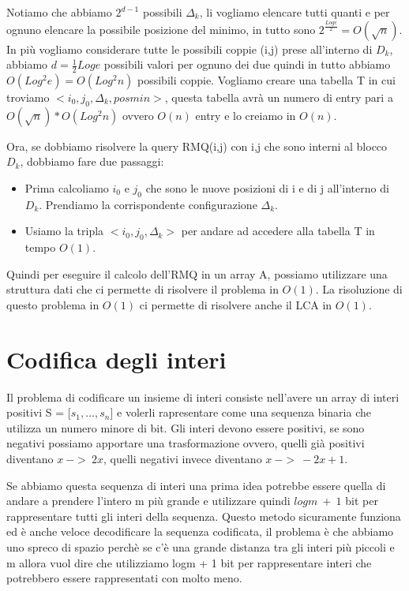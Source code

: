 \documentclass[14pt]{extreport}
\begin{document}
Notiamo che abbiamo $2^{d-1}$ possibili $\Delta_k$, li vogliamo elencare tutti quanti e per ognuno elencare la possibile posizione del minimo, in tutto sono $2^{\frac{Loge}{2}} = O(\sqrt{n})$.
In più vogliamo considerare tutte le possibili coppie (i,j) prese all'interno di $D_k$, abbiamo $d=\frac{1}{2}Log e$ possibili valori per ognuno dei due quindi in tutto abbiamo $O(Log^2 e) = O(Log^2 n)$ possibili coppie.
Vogliamo creare una tabella T in cui troviamo $<i_0,j_0, \Delta_k, pos min>$, questa tabella avrà un numero di entry pari a $O(\sqrt{n})*O(Log^2 n)$ ovvero $O(n)$ entry e lo creiamo in $O(n)$.

Ora, se dobbiamo risolvere la query RMQ(i,j) con i,j che sono interni al blocco $D_k$, dobbiamo fare due passaggi:
\begin{itemize}
\item Prima calcoliamo $i_0$ e $j_0$ che sono le nuove posizioni di i e di j all'interno di $D_k$. Prendiamo la corrispondente configurazione $\Delta_k$.
\item Usiamo la tripla $<i_0,j_0,\Delta_k>$ per andare ad accedere alla tabella T in tempo $O(1)$.
\end{itemize}


Quindi per eseguire il calcolo dell'RMQ in un array A, possiamo utilizzare una struttura dati che ci permette di risolvere il problema in $O(1)$. La risoluzione di questo problema in $O(1)$ ci permette di risolvere anche il LCA in $O(1)$.

\chapter{Codifica degli interi}

Il problema di codificare un insieme di interi consiste nell'avere un array di interi positivi S = [$s_1,...,s_n$] e volerli rapresentare come una sequenza binaria che utilizza un numero minore di bit.
Gli interi devono essere positivi, se sono negativi possiamo apportare una trasformazione ovvero, quelli già positivi diventano $x\ ->\ 2x$, quelli negativi invece diventano $x\ ->\ -2x+1$.

Se abbiamo questa sequenza di interi una prima idea potrebbe essere quella di andare a prendere l'intero m più grande e utilizzare quindi $logm\ +\ 1$ bit per rappresentare tutti gli interi della sequenza.
Questo metodo sicuramente funziona ed è anche veloce decodificare la sequenza codificata, il problema è che abbiamo uno spreco di spazio perchè se c'è una grande distanza tra gli interi più piccoli e m allora vuol dire che utilizziamo logm + 1 bit per rappresentare interi che potrebbero essere rappresentati con molto meno.
\end{document}
